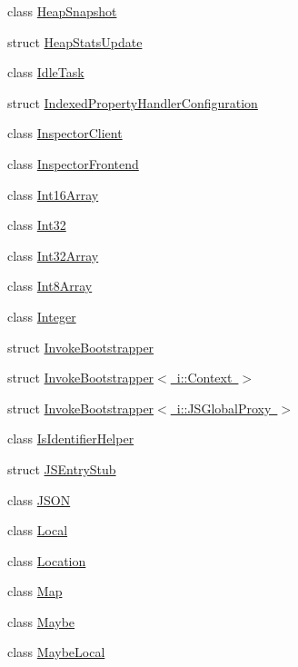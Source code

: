 \begin{DoxyCompactItemize}
\item 
class \mbox{\hyperlink{classv8_1_1HeapSnapshot}{Heap\+Snapshot}}
\item 
struct \mbox{\hyperlink{structv8_1_1HeapStatsUpdate}{Heap\+Stats\+Update}}
\item 
class \mbox{\hyperlink{classv8_1_1IdleTask}{Idle\+Task}}
\item 
struct \mbox{\hyperlink{structv8_1_1IndexedPropertyHandlerConfiguration}{Indexed\+Property\+Handler\+Configuration}}
\item 
class \mbox{\hyperlink{classv8_1_1InspectorClient}{Inspector\+Client}}
\item 
class \mbox{\hyperlink{classv8_1_1InspectorFrontend}{Inspector\+Frontend}}
\item 
class \mbox{\hyperlink{classv8_1_1Int16Array}{Int16\+Array}}
\item 
class \mbox{\hyperlink{classv8_1_1Int32}{Int32}}
\item 
class \mbox{\hyperlink{classv8_1_1Int32Array}{Int32\+Array}}
\item 
class \mbox{\hyperlink{classv8_1_1Int8Array}{Int8\+Array}}
\item 
class \mbox{\hyperlink{classv8_1_1Integer}{Integer}}
\item 
struct \mbox{\hyperlink{structv8_1_1InvokeBootstrapper}{Invoke\+Bootstrapper}}
\item 
struct \mbox{\hyperlink{structv8_1_1InvokeBootstrapper_3_01i_1_1Context_01_4}{Invoke\+Bootstrapper$<$ i\+::\+Context $>$}}
\item 
struct \mbox{\hyperlink{structv8_1_1InvokeBootstrapper_3_01i_1_1JSGlobalProxy_01_4}{Invoke\+Bootstrapper$<$ i\+::\+J\+S\+Global\+Proxy $>$}}
\item 
class \mbox{\hyperlink{classv8_1_1IsIdentifierHelper}{Is\+Identifier\+Helper}}
\item 
struct \mbox{\hyperlink{structv8_1_1JSEntryStub}{J\+S\+Entry\+Stub}}
\item 
class \mbox{\hyperlink{classv8_1_1JSON}{J\+S\+ON}}
\item 
class \mbox{\hyperlink{classv8_1_1Local}{Local}}
\item 
class \mbox{\hyperlink{classv8_1_1Location}{Location}}
\item 
class \mbox{\hyperlink{classv8_1_1Map}{Map}}
\item 
class \mbox{\hyperlink{classv8_1_1Maybe}{Maybe}}
\item 
class \mbox{\hyperlink{classv8_1_1MaybeLocal}{Maybe\+Local}}
\item 

\end{DoxyCompactItemize}
